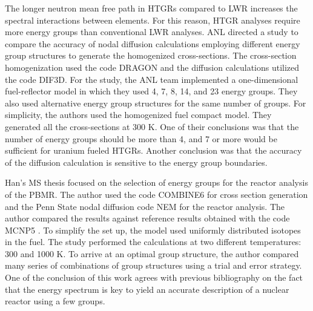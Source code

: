 \documentclass[11pt,letterpaper]{article}
\begin{document}

The longer neutron mean free path in \glspl{HTGR} compared to \gls{LWR} increases the spectral interactions between elements.
For this reason, \gls{HTGR} analyses require more energy groups than conventional \gls{LWR} analyses.
\gls{ANL} directed a study \cite{lee_status_2006} to compare the accuracy of nodal diffusion calculations employing different energy group structures to generate the homogenized cross-sections.
The cross-section homogenization used the code DRAGON and the diffusion calculations utilized the code DIF3D.
For the study, the ANL team implemented a one-dimensional fuel-reflector model in which they used 4, 7, 8, 14, and 23 energy groups.
They also used alternative energy group structures for the same number of groups.
For simplicity, the authors used the homogenized fuel compact model.
They generated all the cross-sections at 300 K.
One of their conclusions was that the number of energy groups should be more than 4, and 7 or more would be sufficient for uranium fueled \glspl{HTGR}.
Another conclusion was that the accuracy of the diffusion calculation is sensitive to the energy group boundaries.

Han's MS thesis \cite{han_sensitivity_2008} focused on the selection of energy groups for the reactor analysis of the \gls{PBMR}.
The author used the code COMBINE6 \cite{grimesey_combinepc-portable_1994} for cross section generation and the Penn State nodal diffusion code NEM \cite{bandini_three-dimensional_1990} for the reactor analysis.
The author compared the results against reference results obtained with the code MCNP5 \cite{rsicc_computer_code_collection_mcnp5_2003}.
To simplify the set up, the model used uniformly distributed isotopes in the fuel.
The study performed the calculations at two different temperatures: 300 and 1000 K.
To arrive at an optimal group structure, the author compared many series of combinations of group structures using a trial and error strategy.
One of the conclusion of this work agrees with previous bibliography \cite{gulf_oil_company_nuclear_1973} \cite{duderstadt_nuclear_1976} on the fact that the energy spectrum is key to yield an accurate description of a nuclear reactor using a few groups.
\end{document}
